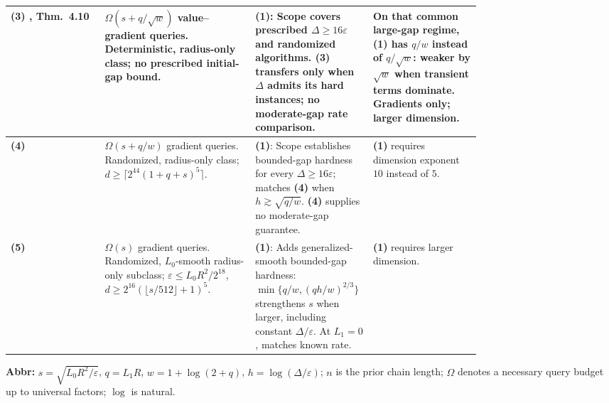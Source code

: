\begin{table}[tp]
\begin{threeparttable}
\begin{tabularx}{\linewidth}{@{}>{\raggedright\arraybackslash}p{0.20\linewidth}>{\raggedright\arraybackslash}p{0.32\linewidth}>{\raggedright\arraybackslash}p{0.25\linewidth}>{\raggedright\arraybackslash}X@{}}
\midrule
\textbf{(3)} \citep{gapEverestI2026v2Verified}, Thm.~4.10 & $\Omega(s+q/\sqrt w)$ value--gradient queries. Deterministic, radius-only class; no prescribed initial-gap bound. & \textbf{(1)}: Scope covers prescribed $\Delta\ge16\varepsilon$ and randomized algorithms. \textbf{(3)} transfers only when $\Delta$ admits its hard instances; no moderate-gap rate comparison. & On that common large-gap regime, \textbf{(1)} has $q/w$ instead of $q/\sqrt w$: weaker by $\sqrt w$ when transient terms dominate. Gradients only; larger dimension. \\
\midrule
\textbf{(4)} \citep{gapFullRepositoryVerified} & $\Omega(s+q/w)$ gradient queries. Randomized, radius-only class; $d\ge\lceil2^{44}(1+q+s)^5\rceil$. & \textbf{(1)}: Scope establishes bounded-gap hardness for every $\Delta\ge16\varepsilon$; matches \textbf{(4)} when $h\gtrsim\sqrt{q/w}$. \textbf{(4)} supplies no moderate-gap guarantee. & \textbf{(1)} requires dimension exponent $10$ instead of $5$. \\
\midrule
\textbf{(5)} \citep{gapSmoothRepositoryVerified} & $\Omega(s)$ gradient queries. Randomized, $L_0$-smooth radius-only subclass; $\varepsilon\le L_0R^2/2^{18}$, $d\ge2^{16}(\lfloor s/512\rfloor+1)^5$. & \textbf{(1)}: Adds generalized-smooth bounded-gap hardness: $\min\{q/w,(qh/w)^{2/3}\}$ strengthens $s$ when larger, including constant $\Delta/\varepsilon$. At $L_1=0$, matches known rate. & \textbf{(1)} requires larger dimension. \\
\bottomrule
\end{tabularx}
\begin{tablenotes}[flushleft]\footnotesize
\item[] \textbf{Abbr:} $s=\sqrt{L_0R^2/\varepsilon}$, $q=L_1R$, $w=1+\log(2+q)$, $h=\log(\Delta/\varepsilon)$; $n$ is the prior chain length; $\Omega$ denotes a necessary query budget up to universal factors; $\log$ is natural.
\end{tablenotes}
\end{threeparttable}
\end{table}
\clearpage
